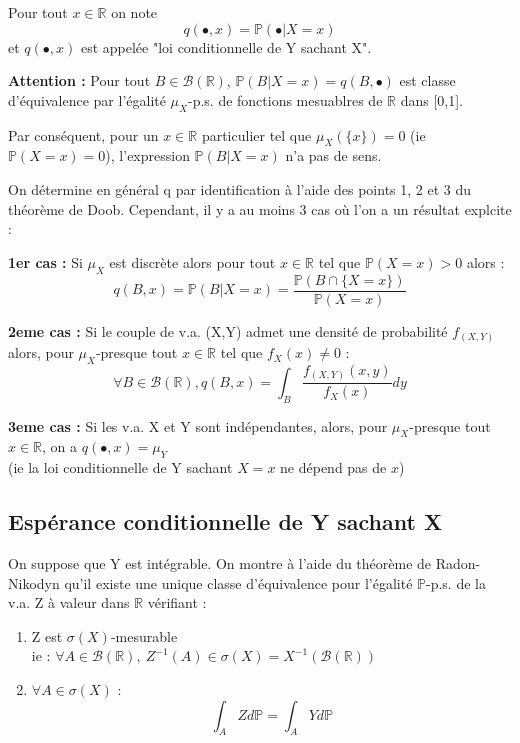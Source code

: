 \begin{Def}
Pour tout $x\in\mathbb{R}$ on note \[q(\bullet,x)=\mathbb{P}(\bullet|X=x)\]
et $q(\bullet,x)$ est appelée "loi conditionnelle de Y sachant X".
\end{Def}

\noindent\textbf{Attention :}
Pour tout $B\in\mathcal{B}(\mathbb{R})$, $\mathbb{P}(B|X=x)=q(B,\bullet)$ est classe d'équivalence par l'égalité $\mu_X$-p.s. de fonctions mesuablres de $\mathbb{R}$ dans [0,1].

Par conséquent, pour un $x\in\mathbb{R}$ particulier tel que $\mu_X(\{x\})=0$ (ie $\mathbb{P}(X=x)=0$), l'expression $\mathbb{P}(B|X=x)$ n'a pas de sens.

On détermine en général q par identification à l'aide des points 1, 2 et 3 du théorème de Doob. Cependant, il y a au moins 3 cas où l'on a un résultat explcite :

\bigskip
\textbf{1er cas :} Si $\mu_X$ est discrète alors pour tout $x\in \mathbb{R}$ tel que $\mathbb{P}(X=x)>0$ alors : 
\[q(B,x)=\mathbb{P}(B|X=x)=\frac{\mathbb{P}(B\cap\{X=x\})}{\mathbb{P}(X=x)}\]

\bigskip
\textbf{2eme cas :} Si le couple de v.a. (X,Y) admet une densité de probabilité $f_{(X,Y)}$ alors, pour $\mu_X$-presque tout $x\in\mathbb{R}$ tel que $f_X(x)\neq0$ : 
\[\forall B\in \mathcal{B}(\mathbb{R}), q(B,x)=\int_B \frac{f_{(X,Y)}(x,y)}{f_X(x)}dy\]

\bigskip
\textbf{3eme cas :} Si les v.a. X et Y sont indépendantes, alors, pour $\mu_X$-presque tout $x\in\mathbb{R}$, on a $q(\bullet,x)=\mu_Y$ \\
(ie la loi conditionnelle de Y sachant $X=x$ ne dépend pas de $x$)

\subsection{Espérance conditionnelle de Y sachant X}
On suppose que Y est intégrable. On montre à l'aide du théorème de Radon-Nikodyn qu'il existe une unique classe d'équivalence pour l'égalité $\mathbb{P}$-p.s. de la v.a. Z à valeur dans $\mathbb{R}$ vérifiant : \begin{enumerate}
\item Z est $\sigma(X)$-mesurable \\ ie : $\forall A \in \mathcal{B}(\mathbb{R}),\ Z^{-1}(A) \in \sigma(X)=X^{-1}(\mathcal{B}(\mathbb{R}))$
\item $\forall A\in \sigma(X)$ : \[\int_A Zd\mathbb{P}=\int_A Yd\mathbb{P}\]
\end{enumerate}

